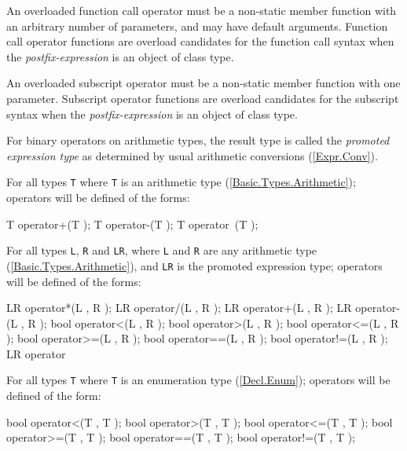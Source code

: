 
\p An overloaded function call operator must be a non-static member function with
an arbitrary number of parameters, and may have default arguments. Function call
operator functions are overload candidates for the function call syntax when the
\textit{postfix-expression} is an object of class type.


\p An overloaded subscript operator must be a non-static member function with one
parameter. Subscript operator functions are overload candidates for the
subscript syntax when the \textit{postfix-expression} is an object of class type.


\p For binary operators on arithmetic types, the result type is called the
\textit{promoted expression type} as determined by usual arithmetic conversions
(\ref{Expr.Conv}).

\p For all types \texttt{T} where \texttt{T} is an arithmetic type (\ref{Basic.Types.Arithmetic});
operators will be defined of the forms:

\begin{HLSL}
T operator+(T );
T operator-(T );
T operator~(T );
\end{HLSL}

\p For all types \texttt{L}, \texttt{R} and \texttt{LR}, where \texttt{L} and \texttt{R} are any arithmetic type
(\ref{Basic.Types.Arithmetic}), and \texttt{LR} is the promoted expression type;
operators will be defined of the forms:

\begin{HLSL}
LR operator*(L , R );
LR operator/(L , R );
LR operator+(L , R );
LR operator-(L , R );
bool operator<(L , R );
bool operator>(L , R );
bool operator<=(L , R );
bool operator>=(L , R );
bool operator==(L , R );
bool operator!=(L , R );
LR operator%
\end{HLSL}

\p For all types \texttt{T} where \texttt{T} is an enumeration type (\ref{Decl.Enum}); operators
will be defined of the form:

\begin{HLSL}
bool operator<(T , T );
bool operator>(T , T );
bool operator<=(T , T );
bool operator>=(T , T );
bool operator==(T , T );
bool operator!=(T , T );
\end{HLSL}

